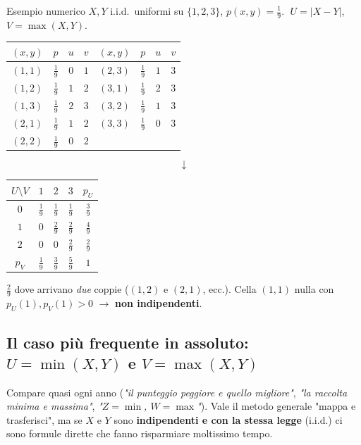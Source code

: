 \documentclass[12pt]{extarticle} %
\begin{document}
\begin{eserciziobox}{{Esempio numerico}}
$X,Y$ i.i.d.\ uniformi su $\{1,2,3\}$, $p(x,y)=\frac19$. $\;U=|X-Y|$, $V=\max(X,Y)$.
\begin{center}\footnotesize
\renewcommand{\arraystretch}{1.1}
\begin{tabular}{|c|c|c|c||c|c|c|c|}
\hline $(x,y)$ & $p$ & $u$ & $v$ & $(x,y)$ & $p$ & $u$ & $v$ \\ \hline
$(1,1)$ & $\frac19$ & $0$ & $1$ & $(2,3)$ & $\frac19$ & $1$ & $3$ \\ \hline
$(1,2)$ & $\frac19$ & $1$ & $2$ & $(3,1)$ & $\frac19$ & $2$ & $3$ \\ \hline
$(1,3)$ & $\frac19$ & $2$ & $3$ & $(3,2)$ & $\frac19$ & $1$ & $3$ \\ \hline
$(2,1)$ & $\frac19$ & $1$ & $2$ & $(3,3)$ & $\frac19$ & $0$ & $3$ \\ \hline
$(2,2)$ & $\frac19$ & $0$ & $2$ & \multicolumn{4}{c|}{} \\ \hline
\end{tabular}
\end{center}
$$\downarrow$$
\begin{center}
\renewcommand{\arraystretch}{1.4}
\begin{tabular}{|c|c|c|c||c|}
\hline $U \setminus V$ & $1$ & $2$ & $3$ & $p_U$ \\ \hline
$0$ & $\frac19$ & $\frac19$ & $\frac19$ & $\frac39$ \\ \hline
$1$ & $0$ & $\frac29$ & $\frac29$ & $\frac49$ \\ \hline
$2$ & $0$ & $0$ & $\frac29$ & $\frac29$ \\ \hline \hline
$p_V$ & $\frac19$ & $\frac39$ & $\frac59$ & $1$ \\ \hline
\end{tabular}
\end{center}
{\footnotesize $\frac29$ dove arrivano \emph{due} coppie ($(1,2)$ e $(2,1)$, ecc.). Cella $(1,1)$ nulla con $p_U(1),p_V(1)>0$ $\to$ \textbf{non indipendenti}.}
\end{eserciziobox}

\newpage
\subsection{Il caso più frequente in assoluto: $U = \min(X,Y)$ e $V = \max(X,Y)$}
Compare quasi ogni anno (\emph{"il punteggio peggiore e quello migliore"}, \emph{"la raccolta minima e massima"}, \emph{"$Z = \min$, $W = \max$"}). Vale il metodo generale "mappa e trasferisci", ma se $X$ e $Y$ sono \textbf{indipendenti e con la stessa legge} (i.i.d.) ci sono formule dirette che fanno risparmiare moltissimo tempo.
\end{document}
